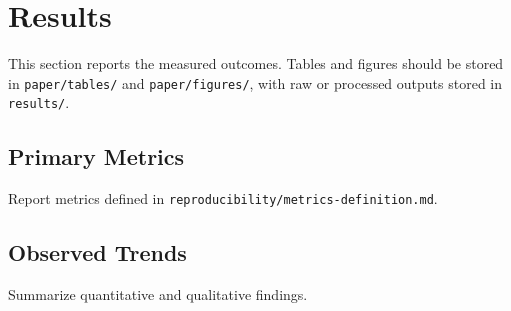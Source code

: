 \section{Results}

This section reports the measured outcomes. Tables and figures should be stored
in \texttt{paper/tables/} and \texttt{paper/figures/}, with raw or processed
outputs stored in \texttt{results/}.

\subsection{Primary Metrics}

Report metrics defined in \texttt{reproducibility/metrics-definition.md}.

\subsection{Observed Trends}

Summarize quantitative and qualitative findings.
